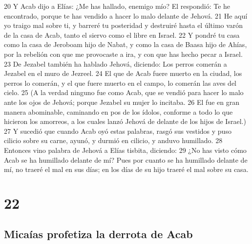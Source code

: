 20 Y Acab dijo a Elías: ¿Me has hallado, enemigo mío? El respondió: Te he encontrado, porque te has vendido a hacer lo malo delante de Jehová.
21 He aquí yo traigo mal sobre ti, y barreré tu posteridad y destruiré hasta el último varón de la casa de Acab, tanto el siervo como el libre en Israel.
22 Y pondré tu casa como la casa de Jeroboam hijo de Nabat, y como la casa de Baasa hijo de Ahías, por la rebelión con que me provocaste a ira, y con que has hecho pecar a Israel.
23 De Jezabel también ha hablado Jehová, diciendo: Los perros comerán a Jezabel en el muro de Jezreel. 
24 El que de Acab fuere muerto en la ciudad, los perros lo comerán, y el que fuere muerto en el campo, lo comerán las aves del cielo.
25 (A la verdad ninguno fue como Acab, que se vendió para hacer lo malo ante los ojos de Jehová; porque Jezabel su mujer lo incitaba.
26 El fue en gran manera abominable, caminando en pos de los ídolos, conforme a todo lo que hicieron los amorreos, a los cuales lanzó Jehová de delante de los hijos de Israel.)
27 Y sucedió que cuando Acab oyó estas palabras, rasgó sus vestidos y puso cilicio sobre su carne, ayunó, y durmió en cilicio, y anduvo humillado.
28 Entonces vino palabra de Jehová a Elías tisbita, diciendo:
29 ¿No has visto cómo Acab se ha humillado delante de mí? Pues por cuanto se ha humillado delante de mí, no traeré el mal en sus días; en los días de su hijo traeré el mal sobre su casa.

\chapter{22}

\section*{Micaías profetiza la derrota de Acab}

